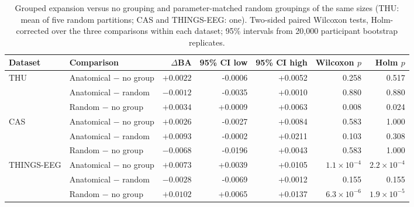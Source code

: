 \begin{table}[H]
\centering
\caption{Grouped expansion versus no grouping and parameter-matched random groupings of the same sizes (THU: mean of five random partitions; CAS and THINGS-EEG: one). Two-sided paired Wilcoxon tests, Holm-corrected over the three comparisons within each dataset; 95\% intervals from 20{,}000 participant bootstrap replicates.}
\label{tab:supp-grouped-tests}
\footnotesize
\begin{adjustbox}{max width=\textwidth}
\begin{tabular}{@{}llrrrrr@{}}
\toprule
Dataset & Comparison & $\Delta$BA & 95\% CI low & 95\% CI high & Wilcoxon $p$ & Holm $p$ \\
\midrule
\multirow{3}{*}{THU} & Anatomical $-$ no group & $+0.0022$ & -0.0006 & +0.0052 & 0.258 & 0.517 \\
 & Anatomical $-$ random & $-0.0012$ & -0.0035 & +0.0010 & 0.880 & 0.880 \\
 & Random $-$ no group & $+0.0034$ & +0.0009 & +0.0063 & 0.008 & 0.024 \\
\midrule
\multirow{3}{*}{CAS} & Anatomical $-$ no group & $+0.0026$ & -0.0027 & +0.0084 & 0.583 & 1.000 \\
 & Anatomical $-$ random & $+0.0093$ & -0.0002 & +0.0211 & 0.103 & 0.308 \\
 & Random $-$ no group & $-0.0068$ & -0.0196 & +0.0043 & 0.583 & 1.000 \\
\midrule
\multirow{3}{*}{THINGS-EEG} & Anatomical $-$ no group & $+0.0073$ & +0.0039 & +0.0105 & $1.1\times10^{-4}$ & $2.2\times10^{-4}$ \\
 & Anatomical $-$ random & $-0.0028$ & -0.0069 & +0.0012 & 0.155 & 0.155 \\
 & Random $-$ no group & $+0.0102$ & +0.0065 & +0.0137 & $6.3\times10^{-6}$ & $1.9\times10^{-5}$ \\
\bottomrule
\end{tabular}
\end{adjustbox}
\end{table}
